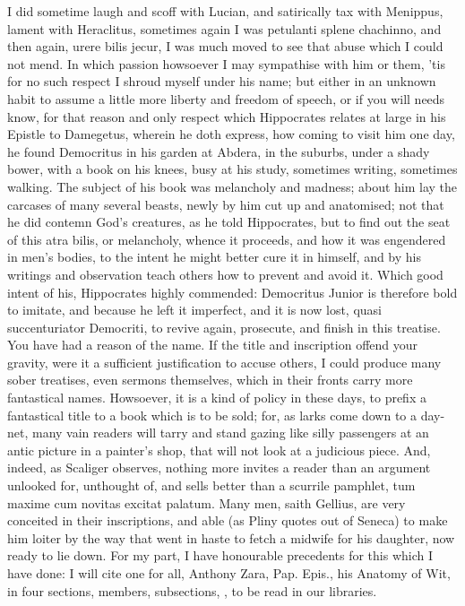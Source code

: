 {I did sometime laugh and scoff with Lucian, and satirically tax with
Menippus, lament with Heraclitus, sometimes again I was petulanti
splene chachinno, and then again, urere bilis jecur, I was much
moved to see that abuse which I could not mend. In which passion
howsoever I may sympathise with him or them, 'tis for no such respect I
shroud myself under his name; but either in an unknown habit to assume
a little more liberty and freedom of speech, or if you will needs know,
for that reason and only respect which Hippocrates relates at large in
his Epistle to Damegetus, wherein he doth express, how coming to visit
him one day, he found Democritus in his garden at Abdera, in the
suburbs, under a shady bower, with a book on his knees, busy at
his study, sometimes writing, sometimes walking. The subject of his
book was melancholy and madness; about him lay the carcases of many
several beasts, newly by him cut up and anatomised; not that he did
contemn God's creatures, as he told Hippocrates, but to find out the
seat of this atra bilis, or melancholy, whence it proceeds, and how it
was engendered in men's bodies, to the intent he might better cure it
in himself, and by his writings and observation teach others how to
prevent and avoid it. Which good intent of his, Hippocrates highly
commended: Democritus Junior is therefore bold to imitate, and because
he left it imperfect, and it is now lost, quasi succenturiator
Democriti, to revive again, prosecute, and finish in this treatise.
You have had a reason of the name. If the title and inscription offend
your gravity, were it a sufficient justification to accuse others, I
could produce many sober treatises, even sermons themselves, which in
their fronts carry more fantastical names. Howsoever, it is a kind of
policy in these days, to prefix a fantastical title to a book which is
to be sold; for, as larks come down to a day-net, many vain readers
will tarry and stand gazing like silly passengers at an antic picture
in a painter's shop, that will not look at a judicious piece. And,
indeed, as Scaliger observes, nothing more invites a reader than an
argument unlooked for, unthought of, and sells better than a scurrile
pamphlet, tum maxime cum novitas excitat palatum. Many men, saith
Gellius, are very conceited in their inscriptions, and able (as
Pliny quotes out of Seneca) to make him loiter by the way that went
in haste to fetch a midwife for his daughter, now ready to lie down.
For my part, I have honourable precedents for this which I have
done: I will cite one for all, Anthony Zara, Pap. Epis., his Anatomy of
Wit, in four sections, members, subsections, \etc, to be read in our
libraries.

}
